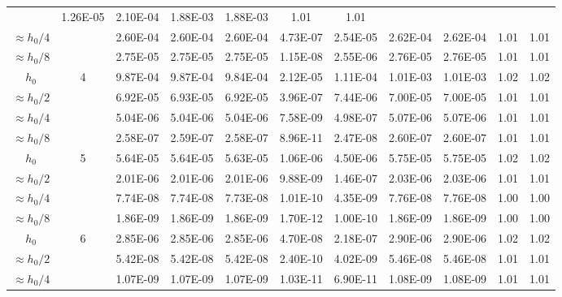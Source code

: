 \documentclass[compress]{beamer}
\begin{document}
\begin{frame}[shrink=16]
{\begin{tabular}{|cc|cc|ccc|cc|rr|}
 &   1.26E-05
 &   2.10E-04
 &   1.88E-03
 &   1.88E-03
 &     \alert{1.01}
 &     1.01
\\
      $\approx \! h_0/4$
 &
 &   2.60E-04
 &   2.60E-04
 &   2.60E-04
 &   4.73E-07
 &   2.54E-05
 &   2.62E-04
 &   2.62E-04
 &     \alert{1.01}
 &     1.01
\\
      $\approx \! h_0/8$
 &
 &   2.75E-05
 &   2.75E-05
 &   2.75E-05
 &   1.15E-08
 &   2.55E-06
 &   2.76E-05
 &   2.76E-05
 &     \alert{1.01}
 &     1.01
\\
 \hline
 $h_0$
 &   \alert{4}
 &   9.87E-04
 &   9.87E-04
 &   9.84E-04
 &   2.12E-05
 &   1.11E-04
 &   1.01E-03
 &   1.01E-03
 &     \alert{1.02}
 &     1.02
\\
      $\approx \! h_0/2$
 &
 &   6.92E-05
 &   6.93E-05
 &   6.92E-05
 &   3.96E-07
 &   7.44E-06
 &   7.00E-05
 &   7.00E-05
 &     \alert{1.01}
 &     1.01
\\
      $\approx \! h_0/4$
 &
 &   5.04E-06
 &   5.04E-06
 &   5.04E-06
 &   7.58E-09
 &   4.98E-07
 &   5.07E-06
 &   5.07E-06
 &     \alert{1.01}
 &     1.01
\\
      $\approx \! h_0/8$
 &
 &   2.58E-07
 &   2.59E-07
 &   2.58E-07
 &   8.96E-11
 &   2.47E-08
 &   2.60E-07
 &   2.60E-07
 &     \alert{1.01}
 &     1.01
\\
 \hline
 $h_0$
 &   \alert{5}
 &   5.64E-05
 &   5.64E-05
 &   5.63E-05
 &   1.06E-06
 &   4.50E-06
 &   5.75E-05
 &   5.75E-05
 &     \alert{1.02}
 &     1.02
\\
      $\approx \! h_0/2$
 &
 &   2.01E-06
 &   2.01E-06
 &   2.01E-06
 &   9.88E-09
 &   1.46E-07
 &   2.03E-06
 &   2.03E-06
 &     \alert{1.01}
 &     1.01
\\
      $\approx \! h_0/4$
 &
 &   7.74E-08
 &   7.74E-08
 &   7.73E-08
 &   1.01E-10
 &   4.35E-09
 &   7.76E-08
 &   7.76E-08
 &     \alert{1.00}
 &     1.00
\\
      $\approx \! h_0/8$
 &
 &   1.86E-09
 &   1.86E-09
 &   1.86E-09
 &   1.70E-12
 &   1.00E-10
 &   1.86E-09
 &   1.86E-09
 &     \alert{1.00}
 &     1.00
\\
 \hline
 $h_0$
 &   \alert{6}
 &   2.85E-06
 &   2.85E-06
 &   2.85E-06
 &   4.70E-08
 &   2.18E-07
 &   2.90E-06
 &   2.90E-06
 &     \alert{1.02}
 &     1.02
\\
      $\approx \! h_0/2$
 &
 &   5.42E-08
 &   5.42E-08
 &   5.42E-08
 &   2.40E-10
 &   4.02E-09
 &   5.46E-08
 &   5.46E-08
 &     \alert{1.01}
 &     1.01
\\
      $\approx \! h_0/4$
 &
 &   1.07E-09
 &   1.07E-09
 &   1.07E-09
 &   1.03E-11
 &   6.90E-11
 &   1.08E-09
 &   1.08E-09
 &     \alert{1.01}
 &     1.01
\\
 \hline
 \end{tabular}
} %

\end{frame}
\end{document}
